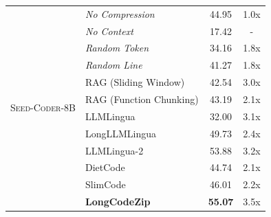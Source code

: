 \documentclass[10pt,conference]{IEEEtran}
\newcommand{\approach}{{LongCodeZip}\xspace} %
\begin{document}
\begin{table}[t]
{\begin{tabular}{llcc}
    \midrule
    \multirow{13}{*}{\textsc{Seed-Coder-8B}} & \textit{No Compression} & 44.95 & 1.0x \\
    & \textit{No Context} & 17.42 & - \\
    \cmidrule{2-4}
    & \textit{Random Token} & 34.16 & 1.8x \\
    & \textit{Random Line} & 41.27 & 1.8x \\
    \cmidrule{2-4}
    & RAG (Sliding Window) & 42.54 & 3.0x \\
    & RAG (Function Chunking) & 43.19 & 2.1x \\
    & LLMLingua & 32.00 & 3.1x \\
    & LongLLMLingua & 49.73 & 2.4x \\
    & LLMLingua-2 & 53.88 & 3.2x \\
    & DietCode & 44.74 & 2.1x \\
    & SlimCode & 46.01 & 2.2x \\
    \cmidrule(lr){2-4}
    & \cellcolor{cyan!10}\textbf{\approach} & \cellcolor{cyan!10}\textbf{55.07} & \cellcolor{cyan!10}3.5x \\
    \bottomrule
    \end{tabular}
    \vspace{-1cm}
    }
\end{table}
\end{document}
